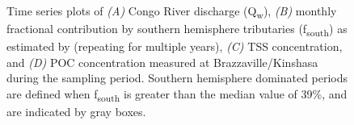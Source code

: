 \begin{figure}[p]
	\caption[Environmental parameter time-series plots]{Time series plots of \textit{(A)} Congo River discharge (Q\textsubscript{w}), \textit{(B)} monthly fractional contribution by southern hemisphere tributaries (f\textsubscript{south}) as estimated by \citet{Bricquet:1993ve} (repeating for multiple years), \textit{(C)} TSS concentration, and \textit{(D)} POC concentration measured at Brazzaville/Kinshasa during the sampling period. Southern hemisphere dominated periods are defined when f\textsubscript{south} is greater than the median value of 39\%, and are indicated by gray boxes.}
	\label{Ch4Fig:2} 
\end{figure}


